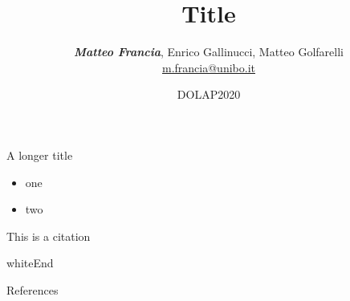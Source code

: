 \documentclass[aspectratio=169]{beamer}
\title[Footnote Title]{Title}
\date[DOLAP]{DOLAP2020}
\author[Matteo Francia (UniBO)]{
    \textit{\textbf{Matteo Francia}}\inst{1}, Enrico Gallinucci\inst{1}, Matteo Golfarelli\inst{1}\\
    \url{m.francia@unibo.it}
}
\institute[UniBO]{\inst{1} University of Bologna}
\begin{document}
\begin{frame}
\titlepage
\end{frame}

{
\begin{frame}{A longer title}
    \begin{itemize}
    \item one
    \item two
    \end{itemize}

This is a citation \cite{DBLP:journals/snam/FranciaGG19}
\end{frame}
}

{
\begin{frame}
    \centering
    \vspace*{\fill}
    \begin{color}{white}\Huge End \end{color} %
    \vspace*{\fill}
\end{frame}
}


\begin{frame}[allowframebreaks]{References}
    \tiny
    
    
\end{frame}
\end{document}
